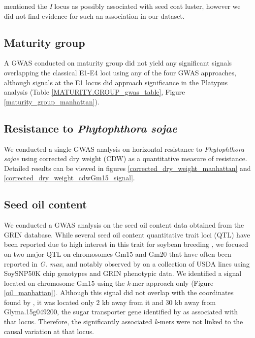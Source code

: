\documentclass[12pt]{article}
\begin{document}

\cite{bandillo2017} mentioned the \textit{I} locus as possibly associated
with seed coat luster, however we did not find evidence for such an association
in our dataset.

\subsection{Maturity group}
\label{sv-gwas-maturity-group}

A GWAS conducted on maturity group did not yield any significant signals
overlapping the classical E1-E4 loci using any of the four GWAS approaches,
although signals at the E1 locus did approach significance in the Platypus
analysis (Table \ref{MATURITY.GROUP_gwas_table}, Figure \ref{maturity_group_manhattan}).

\subsection{Resistance to \emph{Phytophthora sojae}}
\label{sv-gwas-resistance}

We conducted a single GWAS analysis on horizontal resistance to
\textit{Phytophthora sojae} using corrected dry weight (CDW) as a quantitative
measure of resistance. Detailed results can be viewed in figures
\ref{corrected_dry_weight_manhattan} and
\ref{corrected_dry_weight_cdwGm15_signal}.

\subsection{Seed oil content}
\label{sv-gwas-seed-oil-content}

We conducted a GWAS analysis on the seed oil content data obtained from the
GRIN database. While several seed oil content quantitative trait loci (QTL)
have been reported due to high interest in this trait for soybean breeding
\citep{chaudhary2015}, we focused on two major QTL on chromosomes Gm15 and Gm20
that have often been reported in \emph{G. max}, and notably observed by
\cite{bandillo2015} on a collection of USDA lines using SoySNP50K chip
genotypes and GRIN phenotypic data. We identified a signal located on
chromosome Gm15 using the \emph{k}-mer approach only (Figure
\ref{oil_manhattan}). Although this signal did not overlap with the coordinates
found by \cite{bandillo2017}, it was located only 2 kb away from it and 30 kb
away from Glyma.15g049200, the sugar transporter gene identified by
\cite{zhang2020} as associated with that locus. Therefore, the significantly
associated \emph{k}-mers were not linked to the causal variation at that locus.
\end{document}
